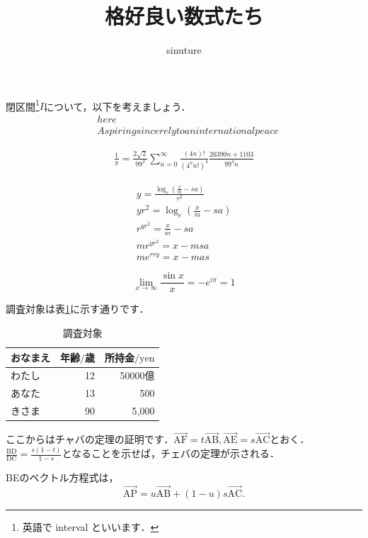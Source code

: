 \documentclass[uplatex,dvipdfmx,a4paper,9pt]{jsarticle}
\title{格好良い数式たち}
\author{sinuture}
\begin{document}
\maketitle

閉区間\footnote{英語で interval といいます．}$I$について，以下を考えましょう． 
\begin{align}
    & here\\
    & Aspiring sincerely to an international peace
\end{align}

\begin{align}
    \frac{1}{\pi} = \frac{2\sqrt{2}}{99^2}\sum_{n=0}^{\infty} \frac{(4n)!}{(4^nn!)^4} \frac{26390n+1103}{99^4n}
\end{align}

\begin{align*}
    y = \frac{\log_e(\frac{x}{m}-sa)}{r^2}\\
    yr^2 = \log_e(\frac{x}{m}-sa)\\
    r^{yr^2} = \frac{x}{m}-sa\\
    mr^{yr^2} = x -msa\\
    me^{rry} = x - mas
\end{align*}

\begin{equation}
    \lim_{ x \rightarrow \infty } \frac{ \sin x }{x} = - e^{ i \pi } = 1
\end{equation}

調査対象は表\ref{かおｎ}に示す通りです．\\
\begin{table}[htbp]
    \centering
    \caption{調査対象}
    \label{かおｎ}
    \begin{tabular}{l|r|r}
        \hline
        おなまえ & 年齢$/$歳 & 所持金$/\mathrm{yen}$\\
        \hline
        わたし & 12 & 50000億\\
        あなた & 13 & 500\\
        きさま & 90 & 5,000\\
        \hline
    \end{tabular}
\end{table}

\pagebreak
ここからはチャバの定理の証明です．$\overrightarrow{\mathrm{AF}} = t\overrightarrow{\mathrm{AB}}, \overrightarrow{\mathrm{AE}}=s\overrightarrow{\mathrm{AC}}$とおく．$\displaystyle\frac{\mathrm{BD}}{\mathrm{DC}} = \frac{s(1-t)}{1-s}$となることを示せば，チェバの定理が示される．

BEのベクトル方程式は，
\begin{equation}
    \overrightarrow{\mathrm{AP}} = u \overrightarrow{\mathrm{AB}} + (1-u)s \overrightarrow{\mathrm{AC}}.
\end{equation}
\end{document}
